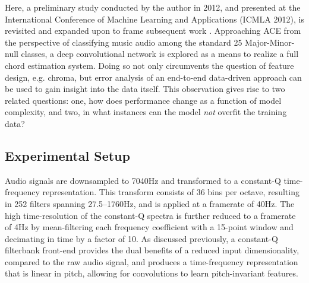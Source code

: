 Here, a preliminary study conducted by the author in 2012, and presented at the International Conference of Machine Learning and Applications (ICMLA 2012), is revisited and expanded upon to frame subsequent work \cite{Humphrey2012Rethinking}.
Approaching ACE from the perspective of classifying music audio among the standard 25 Major-Minor-null classes, a deep convolutional network is explored as a means to realize a full chord estimation system.
Doing so not only circumvents the question of feature design, e.g. chroma, but error analysis of an end-to-end data-driven approach can be used to gain insight into the data itself.
This observation gives rise to two related questions: one, how does performance change as a function of model complexity, and two, in what instances can the model \emph{not} overfit the training data?


\subsection{Experimental Setup}
\label{subsec:experimental_setup}

Audio signals are downsampled to 7040Hz and transformed to a constant-Q time-frequency representation.
This transform consists of 36 bins per octave, resulting in 252 filters spanning 27.5--1760Hz, and is applied at a framerate of 40Hz.
The high time-resolution of the constant-Q spectra is further reduced to a framerate of 4Hz by mean-filtering each frequency coefficient with a 15-point window and decimating in time by a factor of 10.
As discussed previously, a constant-Q filterbank front-end provides the dual benefits of a reduced input dimensionality, compared to the raw audio signal, and produces a time-frequency representation that is linear in pitch, allowing for convolutions to learn pitch-invariant features.

